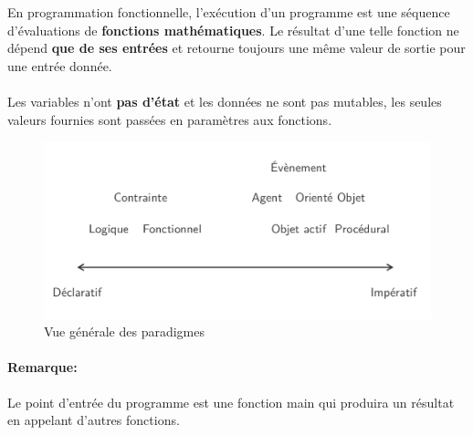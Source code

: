 \item{}
{\faux}
{En programmation fonctionnelle, l'exécution d'un programme est une séquence d'évaluations de \textbf{fonctions mathématiques}. Le résultat d'une telle fonction ne dépend \textbf{que de ses entrées} et retourne toujours une même valeur de sortie pour une entrée donnée.
\paragraph{}
Les variables n'ont \textbf{pas d'état} et les données ne sont pas mutables, les seules valeurs fournies sont passées en paramètres aux fonctions.
\begin{figure}[h!]
\center\includegraphics[scale=.3]{images/vue-paradigmes}
\caption{Vue générale des paradigmes}
\end{figure}
\paragraph{Remarque: }
Le point d'entrée du programme est une fonction main qui produira un résultat en appelant d'autres fonctions.
}


\item{}
{\vrai}
{}